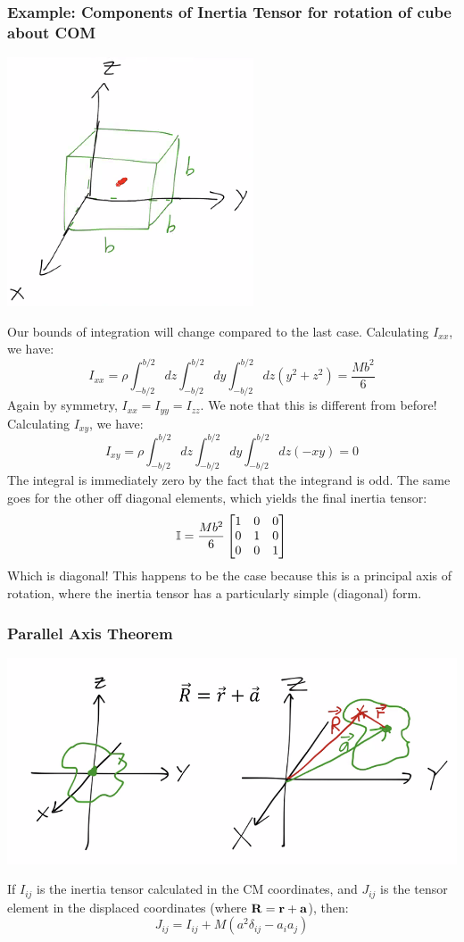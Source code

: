\documentclass[../PHYS306Notes.tex]{subfiles}
\begin{document}
\subsubsection{Example: Components of Inertia Tensor for rotation of cube about COM}
\begin{center}
    \includegraphics[scale=1]{Lecture-18/l18-img4.png}
\end{center}
Our bounds of integration will change compared to the last case. Calculating $I_{xx}$, we have:
\[I_{xx} = \rho\int_{-b/2}^{b/2}dz\int_{-b/2}^{b/2}dy\int_{-b/2}^{b/2}dz(y^2 + z^2) = \frac{Mb^2}{6}\]
Again by symmetry, $I_{xx} = I_{yy} = I_{zz}$. We note that this is different from before! Calculating $I_{xy}$, we have:
\[I_{xy} = \rho\int_{-b/2}^{b/2}dz\int_{-b/2}^{b/2}dy\int_{-b/2}^{b/2}dz(-xy) = 0\]
The integral is immediately zero by the fact that the integrand is odd. The same goes for the other off diagonal elements, which yields the final inertia tensor:
\[\mathbb{I} = \frac{Mb^2}{6}\begin{bmatrix}1 & 0 & 0 \\ 0 & 1 & 0 \\ 0 & 0 & 1\end{bmatrix}\]
Which is diagonal! This happens to be the case because this is a principal axis of rotation, where the inertia tensor has a particularly simple (diagonal) form.

\subsubsection{Parallel Axis Theorem}
\begin{center}
    \includegraphics[scale=0.5]{Lecture-18/l18-img5.png}
\end{center}
If $I_{ij}$ is the inertia tensor calculated in the CM coordinates, and $J_{ij}$ is the tensor element in the displaced coordinates (where $\mathbf{R} = \mathbf{r} + \mathbf{a}$), then:
\[J_{ij} = I_{ij} + M(a^2\delta_{ij} - a_ia_j)\]
\end{document}
